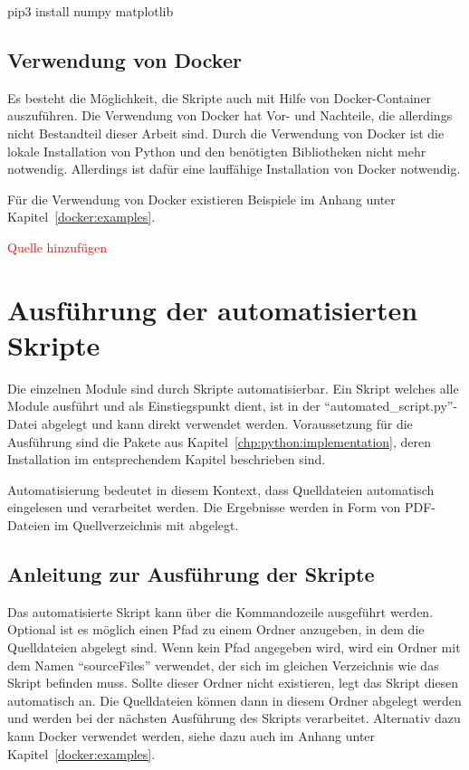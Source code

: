 \begin{Pip3CommandLinux}
pip3 install numpy matplotlib
\end{Pip3CommandLinux}

\section{Verwendung von Docker}
Es besteht die Möglichkeit, die Skripte auch mit Hilfe von Docker-Container auszuführen.
Die Verwendung von Docker hat Vor- und Nachteile, die allerdings nicht Bestandteil dieser Arbeit sind.
Durch die Verwendung von Docker ist die lokale Installation von Python und den benötigten Bibliotheken nicht mehr notwendig.
Allerdings ist dafür eine lauffähige Installation von Docker notwendig.

Für die Verwendung von Docker existieren Beispiele im Anhang unter Kapitel~\ref{docker:examples}.

\textcolor{red}{Quelle hinzufügen}







\chapter{Ausführung der automatisierten Skripte}
Die einzelnen Module sind durch Skripte automatisierbar.
Ein Skript welches alle Module ausführt und als Einstiegspunkt dient, ist in der \enquote{automated\_script.py}-Datei abgelegt und kann direkt verwendet werden.
Voraussetzung für die Ausführung sind die Pakete aus Kapitel~\ref{chp:python:implementation}, deren Installation im entsprechendem Kapitel beschrieben sind.

Automatisierung bedeutet in diesem Kontext, dass Quelldateien automatisch eingelesen und verarbeitet werden.
Die Ergebnisse werden in Form von PDF-Dateien im Quellverzeichnis mit abgelegt.

\section{Anleitung zur Ausführung der Skripte}
Das automatisierte Skript kann über die Kommandozeile ausgeführt werden.
Optional ist es möglich einen Pfad zu einem Ordner anzugeben, in dem die Quelldateien abgelegt sind.
Wenn kein Pfad angegeben wird, wird ein Ordner mit dem Namen \enquote{sourceFiles} verwendet, der sich im gleichen Verzeichnis wie das Skript befinden muss.
Sollte dieser Ordner nicht existieren, legt das Skript diesen automatisch an.
Die Quelldateien können dann in diesem Ordner abgelegt werden und werden bei der nächsten Ausführung des Skripts verarbeitet.
Alternativ dazu kann Docker verwendet werden, siehe dazu auch im Anhang unter Kapitel~\ref{docker:examples}.

